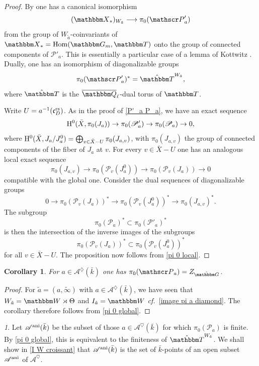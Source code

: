 \documentclass[12pt,english]{smfart}
\numberwithin{equation}{subsection}
\newtheorem{corollary}[equation]{Corollary}
\theoremstyle{remark}
\newtheorem{numero}[equation]{}
\newcommand\calA{{\mathscr A}}
\newcommand\calP{{\mathscr P}}
\newcommand\frakc{{\mathfrak c}}
\newcommand\GG{{\mathbbm G}}
\newcommand\QQ{{\mathbbm Q}}
\newcommand\bbW{{\mathbbm W}}
\newcommand\bbT{{\mathbbm T}}
\newcommand\rmH{{\rm H}}
\newcommand\bbX{{\mathbbm X}}
\newcommand\Hom{{\rm Hom}}
\newcommand\cf{{\it cf.\ }}
\newcommand\rs{{\rm rs}}
\newcommand\ani{{\rm ani}}
\newcommand\Ql{{\overline\QQ_\ell}}
\begin{document}
\begin{proof}
By \cite[Cor.~6.7]{N} one has a canonical isomorphism
$$(\bbX_*)_{W_{\tilde a}}\longrightarrow \pi_0(\calP'_a)$$
from the group of $W_{\tilde a}$-coinvariants of $\bbX_*=\Hom(\GG_m,\bbT)$ onto the group of connected components of $\calP'_a$. This is essentially a particular case of a lemma of Kottwitz \cite[Lemma~2.2]{K-Iso1}. Dually, one has an isomorphism of diagonalizable groups
$$\pi_0(\calP'_a)^*=\hat\bbT^{W_{\tilde a}},$$
where $\hat\bbT$ is the $\Ql$-dual torus of $\bbT$.

Write $U=a^{-1}(\frakc^\rs_D)$. As in the proof of \ref{P'_a P_a}, we have an exact sequence
$$\rmH^0(\bar X,\pi_0(J_a))\rightarrow\pi_0(\calP'_a)\rightarrow\pi_0(\calP_a)\rightarrow 0,$$
where $\rmH^0(\bar X,J_a/J_a^0)=\bigoplus_{v\in\bar X-U}\pi_0(J_{a,v})$, with $\pi_0(J_{a,v})$ the group of connected components of the fiber of $J_a$ at $v$. For every $v\in\bar X-U$ one has an analogous local exact sequence
$$\pi_0(J_{a,v})\rightarrow\pi_0(\calP_v(J_a^0))\rightarrow\pi_0(\calP_v(J_a))\rightarrow 0$$
compatible with the global one. Consider the dual sequences of diagonalizable groups
$$0\rightarrow\pi_0(\calP_v(J_a))^*\rightarrow\pi_0(\calP_v(J_a^0))^*\rightarrow\pi_0(J_{a,v})^*.$$
The subgroup
$$\pi_0(\calP_a)^*\subset\pi_0(\calP'_a)^*$$
is then the intersection of the inverse images of the subgroups
$$\pi_0(\calP_v(J_a))^*\subset\pi_0(\calP_v(J_a^0))^*$$
for all $v\in\bar X-U$. The proposition now follows from \ref{pi 0 local}.
\end{proof}

\begin{corollary}\label{pi 0 A diamond}
For $a\in\calA^\diamondsuit(\bar k)$ one has $\pi_0(\calP_a)=Z_{\hat\GG}$.
\end{corollary}

\begin{proof}
For $\tilde a=(a,\tilde\infty)$ with $a\in\calA^\diamondsuit(\bar k)$, we have seen that $W_{\tilde a}=\bbW\rtimes\Theta$ and $I_{\tilde a}=\bbW$ \cf \ref{image pi a diamond}. The corollary therefore follows from \ref{pi 0 global}.
\end{proof}

\begin{numero}\label{A ani def}
Let $\calA^\ani(\bar k)$ be the subset of those $a\in\calA^\heartsuit(\bar k)$ for which $\pi_0(\calP_a)$ is finite. By \ref{pi 0 global}, this is equivalent to the finiteness of $\hat\bbT^{W_{\tilde a}}$. We shall show in \ref{I W croissant} that $\calA^\ani(\bar k)$ is the set of $\bar k$-points of an open subset $\calA^\ani$ of $\calA^\heartsuit$.
\end{numero}
\end{document}
